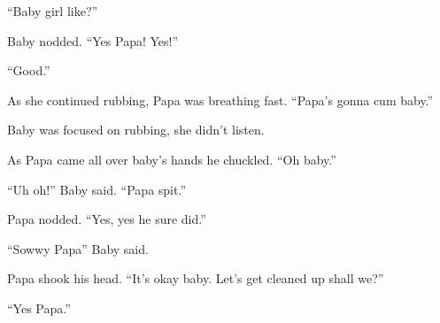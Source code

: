      “Baby girl like?”

     Baby nodded. “Yes Papa! Yes!”

     “Good.”

     As she continued rubbing, Papa was breathing fast. “Papa’s gonna cum baby.”

     Baby was focused on rubbing, she didn’t listen.

     As Papa came all over baby’s hands he chuckled. “Oh baby.”

     “Uh oh!” Baby said. “Papa spit.”

     Papa nodded. “Yes, yes he sure did.”

     “Sowwy Papa” Baby said.

     Papa shook his head. “It’s okay baby. Let’s get cleaned up shall we?”

     “Yes Papa.”



